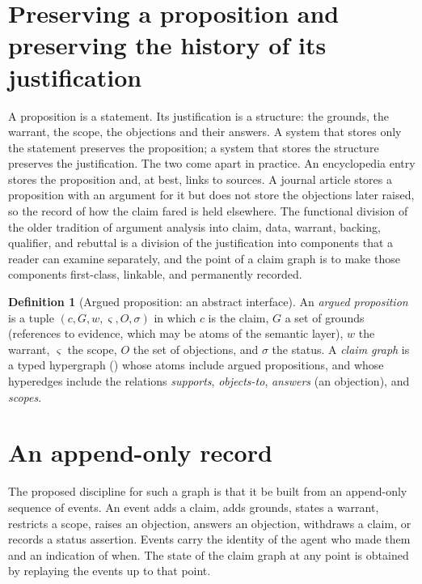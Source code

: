 \documentclass[11pt,twoside,openright]{book}
\theoremstyle{plain}
\theoremstyle{definition}
\newtheorem{definition}[theorem]{Definition}
\theoremstyle{remark}
\begin{document}
\section{Preserving a proposition and preserving the history of its justification}

A proposition is a statement. Its justification is a structure: the grounds, the warrant, the scope, the objections and their answers. A system that stores only the statement preserves the proposition; a system that stores the structure preserves the justification. The two come apart in practice. An encyclopedia entry stores the proposition and, at best, links to sources. A journal article stores a proposition with an argument for it but does not store the objections later raised, so the record of how the claim fared is held elsewhere. The functional division of the older tradition of argument analysis into claim, data, warrant, backing, qualifier, and rebuttal \cite{toulmin1958} is a division of the justification into components that a reader can examine separately, and the point of a claim graph is to make those components first-class, linkable, and permanently recorded.

\begin{definition}[Argued proposition: an abstract interface]\label{def:argued}
An \emph{argued proposition} is a tuple $(c,G,w,\varsigma,O,\sigma)$ in which $c$ is the claim, $G$ a set of grounds (references to evidence, which may be atoms of the semantic layer), $w$ the warrant, $\varsigma$ the scope, $O$ the set of objections, and $\sigma$ the status. A \emph{claim graph} is a typed hypergraph () whose atoms include argued propositions, and whose hyperedges include the relations \emph{supports}, \emph{objects-to}, \emph{answers} (an objection), and \emph{scopes}.
\end{definition}

\section{An append-only record}

The proposed discipline for such a graph is that it be built from an append-only sequence of events. An event adds a claim, adds grounds, states a warrant, restricts a scope, raises an objection, answers an objection, withdraws a claim, or records a status assertion. Events carry the identity of the agent who made them and an indication of when. The state of the claim graph at any point is obtained by replaying the events up to that point.
\end{document}
